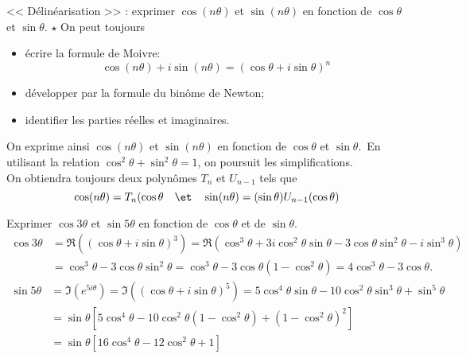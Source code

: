 \documentclass[11pt]{article}
\begin{document}
\begin{meth}{<< Délinéarisation >> : exprimer $\cos(n\theta)$ et $\sin(n\theta)$ en fonction de $\cos\theta$ et $\sin\theta$. $\star$}{}
    On peut toujours
    \begin{itemize}
        \item écrire la formule de Moivre:
        \begin{equation*}
            \cos(n\theta)+i\sin(n\theta)=(\cos\theta+i\sin\theta)^n
        \end{equation*}
        \item développer par la formule du binôme de Newton;
        \item identifier les parties réelles et imaginaires.
    \end{itemize}
    On exprime ainsi $\cos(n\theta)$ et $\sin(n\theta)$ en fonction de $\cos \theta$ et $\sin\theta$.\
    En utilisant la relation $\cos^2\theta+\sin^2\theta=1$, on poursuit les simplifications.\\
    On obtiendra toujours deux polynômes $T_n$ et $U_{n-1}$ tels que
    \begin{equation*}
        \cos(n\theta)=T_n(\cos\theta \quad \et \quad \sin(n\theta)=(\sin \theta)U_{n-1}(\cos\theta)
    \end{equation*}
\end{meth}

\begin{ex}{}{}
    Exprimer $\cos3\theta$ et $\sin5\theta$ en fonction de $\cos\theta$ et de $\sin\theta$.
    \tcblower
    \begin{align*}
        \cos3\theta&=\Re((\cos \theta + i\sin\theta)^3)=\Re(\cos^3\theta+3i\cos^2\theta\sin\theta-3\cos\theta\sin^2\theta-i\sin^3\theta)\\
        &=\cos^3\theta-3\cos\theta\sin^2\theta=\cos^3\theta-3\cos\theta(1-\cos^2\theta)=4\cos^3\theta-3\cos\theta.
    \end{align*}
    \begin{align*}
        \sin5\theta&=\Im(e^{5i\theta})=\Im((\cos\theta+i\sin\theta)^5)=5\cos^4\theta\sin\theta-10\cos^2\theta\sin^3\theta+\sin^5\theta\\
        &=\sin\theta\left[ 5\cos^4\theta-10\cos^2\theta(1-\cos^2\theta)+(1-\cos^2\theta)^2 \right]\\
        &=\sin\theta\left[ 16\cos^4\theta - 12\cos^2\theta + 1 \right]
    \end{align*}
\end{ex}
\end{document}
